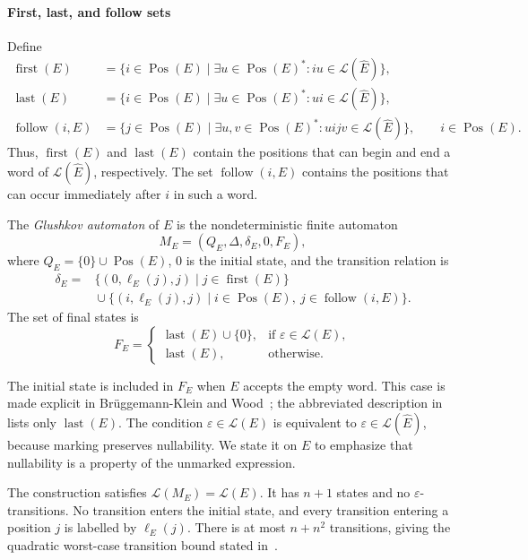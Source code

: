 \paragraph{First, last, and follow sets}
Define
\[
\begin{aligned}
  \operatorname{first}(E)
    &=\{i\in\operatorname{Pos}(E)\mid
        \exists u\in\operatorname{Pos}(E)^*: iu\in\mathcal L(\widehat{E})\},\\
  \operatorname{last}(E)
    &=\{i\in\operatorname{Pos}(E)\mid
        \exists u\in\operatorname{Pos}(E)^*: ui\in\mathcal L(\widehat{E})\},\\
  \operatorname{follow}(i,E)
    &=\{j\in\operatorname{Pos}(E)\mid
        \exists u,v\in\operatorname{Pos}(E)^*: uijv\in\mathcal L(\widehat{E})\},
        \qquad i\in\operatorname{Pos}(E).
\end{aligned}
\]
Thus, $\operatorname{first}(E)$ and $\operatorname{last}(E)$ contain the
positions that can begin and end a word of $\mathcal L(\widehat{E})$, respectively.
The set $\operatorname{follow}(i,E)$ contains the positions that can occur
immediately after $i$ in such a word.

\begin{samepage}
\begin{definition}\label{def:glushkov-automaton}
The \emph{Glushkov automaton} of $E$ is the nondeterministic finite automaton
\[
  M_E=(Q_E,\Delta,\delta_E,0,F_E),
\]
where $Q_E=\{0\}\cup\operatorname{Pos}(E)$, $0$ is the initial state,
and the transition relation is
\[
\begin{aligned}
  \delta_E={}&\{(0,\ell_E(j),j)\mid j\in\operatorname{first}(E)\}\\
             &{}\cup\{(i,\ell_E(j),j)\mid
                 i\in\operatorname{Pos}(E),\ j\in\operatorname{follow}(i,E)\}.
\end{aligned}
\]
The set of final states is
\[
  F_E=
  \begin{cases}
    \operatorname{last}(E)\cup\{0\}, & \text{if }\varepsilon\in\mathcal L(E),\\
    \operatorname{last}(E), & \text{otherwise}.
  \end{cases}
\]
\end{definition}
\end{samepage}

The initial state is included in $F_E$ when $E$ accepts the empty word.
This case is made explicit in
Br\"uggemann-Klein and Wood~\cite[Definition~2.3]{BruggemannKleinW98};
the abbreviated description in~\cite[Section~3.2]{GiammarresiPW98}
lists only $\operatorname{last}(E)$. The condition
$\varepsilon\in\mathcal L(E)$ is equivalent to
$\varepsilon\in\mathcal L(\widehat{E})$, because marking preserves
nullability. We state it on $E$ to emphasize that nullability is a
property of the unmarked expression.

The construction satisfies $\mathcal L(M_E)=\mathcal L(E)$.
It has $n+1$ states and no $\varepsilon$-transitions. No transition enters
the initial state, and every transition entering a position $j$ is
labelled by $\ell_E(j)$. There is at most $n+n^2$ transitions, giving
the quadratic worst-case transition bound stated
in~\cite[Section~3.2]{GiammarresiPW98}.
